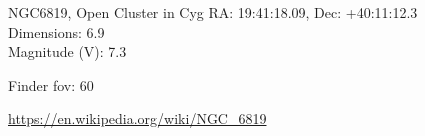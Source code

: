 \begin{block}{NGC6819, Open Cluster in Cyg}
    RA: 19:41:18.09, Dec: +40:11:12.3 \\ 
    Dimensions: 6.9 \\ 
    Magnitude (V): 7.3



    Finder fov: 60 

    \url{https://en.wikipedia.org/wiki/NGC_6819} 
\end{block}